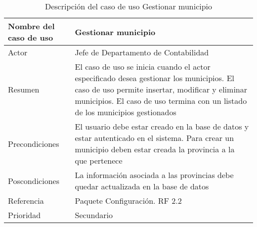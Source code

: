 \begin{table}[H]
	\sf
	\begin{supertabular}{|p{4.5cm}|p{12cm}|}
		\hline
		\textbf{Nombre del caso de uso}
		& \textbf{Gestionar municipio} \\ \hline
		
		Actor
		& Jefe de Departamento de Contabilidad \\ \hline
		
		Resumen
		& El caso de uso se inicia cuando el actor especificado desea gestionar los municipios. El caso de uso permite insertar, modificar y eliminar municipios. El caso de uso termina con un listado de los municipios gestionados \\ \hline
		
		Precondiciones
		& El usuario debe estar creado en la base de datos y estar autenticado en el sistema. Para crear un municipio deben estar creada la provincia a la que pertenece \\ \hline
		
		Poscondiciones
		& La información asociada a las provincias debe quedar actualizada en la base de datos \\ \hline
		
		Referencia
		& Paquete Configuración. RF 2.2 \\ \hline
		
		Prioridad
		& Secundario \\		
		\hline
	\end{supertabular}
	\caption[Descripción del caso de uso Gestionar municipio]{Descripción del caso de uso Gestionar municipio}
	\label{table:CU_GestMuni}
\end{table}

